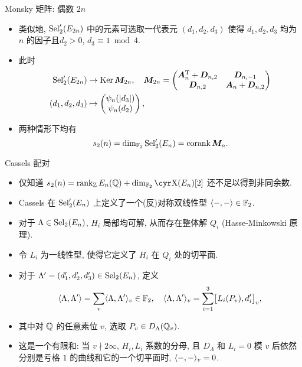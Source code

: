 \documentclass[handout,aspectratio=169]{ctexbeamer}
\begin{document}
\begin{frame}{Monsky 矩阵: 偶数 $2n$}
	\begin{itemize}
		\item 类似地, ${\mathrm{Sel}}_2'(E_{2n})$ 中的元素可选取一代表元 $(d_1,d_2,d_3)$ 使得 $d_1,d_2, d_3$ 均为 $n$ 的因子且$d_2>0$, $d_3\equiv1\bmod4$.
		\item 此时
		\[
			\begin{aligned}
				{\mathrm{Sel}}_2'(E_{2n})&\rightarrow\operatorname{Ker}{\boldsymbol{M}}_{2n},\quad {\boldsymbol{M}}_{2n}=\begin{pmatrix}
					{\boldsymbol{A}}_n^{\mathrm{T}}+{\boldsymbol{D}}_{n,2}&{\boldsymbol{D}}_{n,-1}\\
					{\boldsymbol{D}}_{n,2}&{\boldsymbol{A}}_n+{\boldsymbol{D}}_{n,2}
				\end{pmatrix}\\
				(d_1,d_2,d_3)&\mapsto\begin{pmatrix}
					\psi_n(|d_3|)\\ \psi_n(d_2)
				\end{pmatrix},
			\end{aligned}
		\]
		\item 两种情形下均有
		\[
			s_2(n)=\dim_{{\mathbb{F}}_2}{\mathrm{Sel}}_2'(E_n)=\operatorname{corank} {\boldsymbol{M}}_n.
		\]
	\end{itemize}
\end{frame}


\begin{frame}{Cassels 配对}
	\begin{itemize}
		\item 仅知道 $s_2(n)=\rank_\BZ E_n(\BQ)+\dim_{\BF_2}\Sha(E_n)[2]$ 还不足以得到非同余数.
		\item Cassels 在 ${\mathrm{Sel}}_2'(E_n)$ 上定义了一个(反)对称双线性型 $\langle{-,-}\rangle\in{\mathbb{F}}_2$.
		\item 对于 $\Lambda\in{\mathrm{Sel}}_2(E_n)$, $H_i$ 局部均可解, 从而存在整体解 $Q_i$ (Hasse-Minkowski 原理).
		\item 令 $L_i$ 为一线性型, 使得它定义了 $H_i$ 在 $Q_i$ 处的切平面.
		\item 对于 $\Lambda'=(d'_1,d'_2,d'_3)\in{\mathrm{Sel}}_2(E_n)$, 定义
		\[
			\langle{\Lambda,\Lambda'}\rangle=\sum_v\langle{\Lambda,\Lambda'}\rangle_v\in{\mathbb{F}}_2,
			\quad
			\langle{\Lambda,\Lambda'}\rangle_v
			=\sum_{i=1}^3 \bigl[L_i(P_v),d_i'\bigr]_v,
		\]
		\item 其中对 ${\mathbb{Q}}$ 的任意素位 $v$, 选取 $P_v\in D_\Lambda({\mathbb{Q}}_v)$.
		\item 这是一个有限和: 当 $v\nmid 2\infty$, $H_i,L_i$ 系数的分母, 且 $D_\Lambda$ 和 $L_i=0$ 模 $v$ 后依然分别是亏格 $1$ 的曲线和它的一个切平面时, $\langle{-,-}\rangle_v=0$.
	\end{itemize}
\end{frame}
\end{document}
